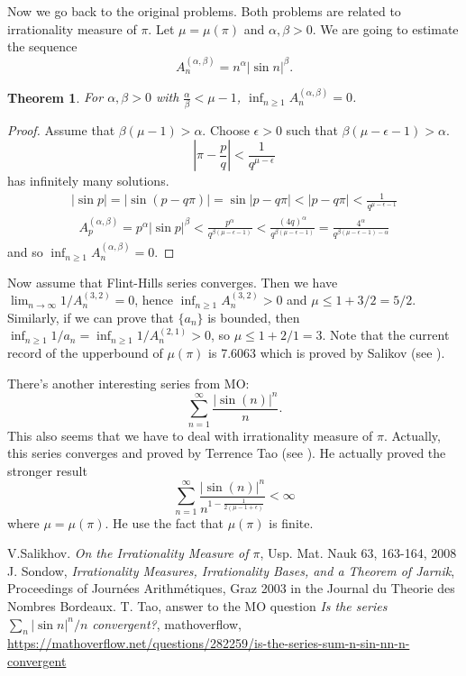 \documentclass{article}
\newtheorem{theorem}{Theorem}
\begin{document}
Now we go back to the original problems. Both problems are related to irrationality measure of $\pi$. Let $\mu = \mu(\pi)$ and $\alpha, \beta >0$. We are going to estimate the sequence 
$$
A_{n}^{(\alpha, \beta)} =n^{\alpha}|\sin n|^{\beta}.
$$
\begin{theorem}
For $\alpha, \beta>0$ with $\frac{\alpha}{\beta}<\mu-1$, $\inf_{n\geq 1} A_{n}^{(\alpha, \beta)} = 0$. 
\end{theorem}
\begin{proof}
Assume that $\beta(\mu-1)>\alpha$. Choose $\epsilon>0$ such that $\beta(\mu-\epsilon-1)>\alpha$. 
$$
\left| \pi - \frac{p}{q}\right| < \frac{1}{q^{\mu-\epsilon}}
$$
has infinitely many solutions. 
\begin{align*}
|\sin p | = |\sin (p-q\pi)| = \sin |p-q\pi|  < |p-q\pi| < \frac{1}{q^{\mu-\epsilon-1}}
\end{align*}
\begin{align*}
A_{p}^{(\alpha, \beta)} = p^{\alpha}|\sin p|^{\beta} < \frac{p^{\alpha}}{q^{\beta(\mu-\epsilon-1)}} < \frac{(4q)^{\alpha}}{q^{\beta(\mu-\epsilon-1)}} = \frac{4^{\alpha}}{q^{\beta(\mu-\epsilon-1)-\alpha}}
\end{align*}
and so  $\inf_{n\geq 1}A_{n}^{(\alpha, \beta)}=0$. 
\end{proof}
Now assume that Flint-Hills series converges. Then we have $\lim_{n\to \infty} 1/A_{n}^{(3, 2)} = 0$, hence $\inf_{n\geq 1}A_{n}^{(3, 2)}  > 0$ and $\mu \leq 1+ 3/2 = 5/2$. Similarly, if we can prove that $\{a_{n}\}$ is bounded, then $\inf_{n\geq 1} 1/a_{n} = \inf_{n\geq 1} 1/A_{n}^{(2, 1)} >0$, so $\mu \leq 1 + 2/1 = 3$. Note that the current record of the upperbound of $\mu(\pi)$ is 7.6063 which is proved by Salikov (see \cite{sa}). 

There's another interesting series from MO:
$$
\sum_{n=1}^{\infty} \frac{|\sin (n)|^{n}}{n}.
$$
This also seems that we have to deal with irrationality measure of $\pi$. Actually, this series converges and proved by Terrence Tao (see \cite{ta}). He actually proved the stronger result 
$$
\sum_{n=1}^{\infty} \frac{|\sin (n)|^{n}}{n^{1-\frac{1}{2(\mu-1+\epsilon)}}}<\infty
$$
where $\mu = \mu(\pi)$. He use the fact that $\mu(\pi)$ is finite. 



\begin{thebibliography}{5}
V.Salikhov. \emph{On the Irrationality Measure of $\pi$}, Usp. Mat. Nauk 63, 163-164, 2008
J. Sondow, \emph{Irrationality Measures, Irrationality Bases, and a Theorem of Jarnik}, Proceedings of Journées Arithmétiques, Graz 2003 in the Journal du Theorie des Nombres Bordeaux.
T. Tao, answer to the MO question \emph{Is the series $\sum_{n}|\sin n|^{n}/n$ convergent?}, mathoverflow, \url{https://mathoverflow.net/questions/282259/is-the-series-sum-n-sin-nn-n-convergent}
\end{thebibliography}
\end{document}
